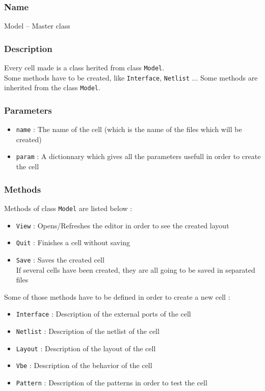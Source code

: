 \subsubsection{Name}

Model -- Master class

\subsubsection{Description}

Every cell made is a class herited from class \verb-Model-.\\
\indent Some methods have to be created, like \verb-Interface-, \verb-Netlist- ... Some methods are inherited from the class \verb-Model-.

\subsubsection{Parameters}

\begin{itemize}
    \item \verb-name- : The name of the cell (which is the name of the files which will be created)
    \item \verb-param- : A dictionnary which gives all the parameters usefull in order to create the cell
\end{itemize}
  
\subsubsection{Methods}

Methods of class \verb-Model- are listed below :
\begin{itemize}
    \item \verb-View- : Opens/Refreshes the editor in order to see the created layout
    \item \verb-Quit- : Finishes a cell without saving
    \item \verb-Save- : Saves the created cell\\If several cells have been created, they are all going to be saved in separated files\\
\end{itemize}

Some of those methods have to be defined in order to create a new cell :
\begin{itemize}
    \item \verb-Interface- : Description of the external ports of the cell
    \item \verb-Netlist- : Description of the netlist of the cell
    \item \verb-Layout- : Description of the layout of the cell
    \item \verb-Vbe- : Description of the behavior of the cell
    \item \verb-Pattern- : Description of the patterns in order to test the cell
\end{itemize} 
    
